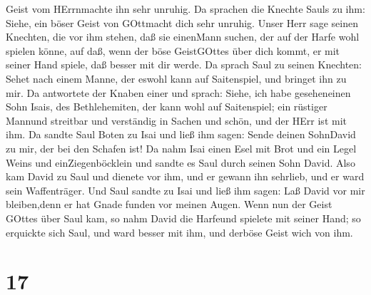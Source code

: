 Geist vom HErrnmachte ihn sehr unruhig.  Da sprachen die
Knechte Sauls zu ihm: Siehe, ein böser Geist von GOttmacht dich sehr
unruhig.  Unser Herr sage seinen Knechten, die vor ihm
stehen, daß sie einenMann suchen, der auf der Harfe wohl spielen könne,
auf daß, wenn der böse GeistGOttes über dich kommt, er mit seiner Hand
spiele, daß besser mit dir werde.  Da sprach Saul zu seinen
Knechten: Sehet nach einem Manne, der eswohl kann auf Saitenspiel, und
bringet ihn zu mir.  Da antwortete der Knaben einer und
sprach: Siehe, ich habe geseheneinen Sohn Isais, des Bethlehemiten, der
kann wohl auf Saitenspiel; ein rüstiger Mannund streitbar und verständig
in Sachen und schön, und der HErr ist mit ihm.  Da sandte
Saul Boten zu Isai und ließ ihm sagen: Sende deinen SohnDavid zu mir,
der bei den Schafen ist!  Da nahm Isai einen Esel mit Brot
und ein Legel Weins und einZiegenböcklein und sandte es Saul durch
seinen Sohn David.  Also kam David zu Saul und dienete vor
ihm, und er gewann ihn sehrlieb, und er ward sein Waffenträger.
 Und Saul sandte zu Isai und ließ ihm sagen: Laß David vor
mir bleiben,denn er hat Gnade funden vor meinen Augen. 
Wenn nun der Geist GOttes über Saul kam, so nahm David die Harfeund
spielete mit seiner Hand; so erquickte sich Saul, und ward besser mit
ihm, und derböse Geist wich von ihm.

\hypertarget{section-16}{%
\section{17}\label{section-16}}

